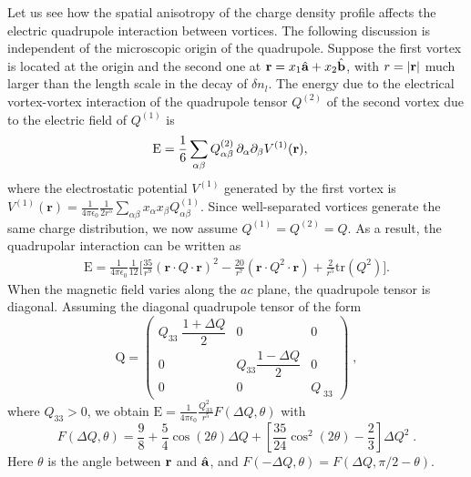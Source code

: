 Let us see how the spatial anisotropy of the charge density profile affects the electric quadrupole interaction between vortices.
The following discussion is independent of the microscopic origin of the quadrupole.
Suppose the first vortex is located at the origin and the second one at   $\mathbf r=x_1\hat{\mathbf a}+x_2\hat{\mathbf b}$, with $r=|\mathbf r|$ much larger than the length scale in the decay of $\delta n_l$.  The energy due to the electrical vortex-vortex interaction of the quadrupole tensor $Q^{(2)}$  of the second vortex due to the electric field of $Q^{(1)}$  is
\begin{equation}
\begin{split}
 \mathrm E &= \frac{1}{6}  \sum_{\alpha\beta} Q^{(2)}_{\alpha \beta}  \,  \partial_\alpha \partial_\beta V^{(1)}(\mathbf r)  ,
\end{split}
\end{equation}
where the electrostatic potential $V^{(1)}$ generated by  the first vortex is $V^{(1)}(\mathbf{r}) = \frac{1}{4 \pi \epsilon_0}  \frac{1}{2r^5}  \sum_{\alpha\beta} x_\alpha x_\beta Q_{\alpha \beta}^{(1)}$.
Since well-separated vortices generate the same charge distribution, we now assume $Q^{(1)}=Q^{(2)}=Q$.
As a result, the quadrupolar interaction can be written as
\begin{align}
    \mathrm E = \frac{1}{4 \pi \epsilon_0}\frac{1}{12}\Big[
    \frac{35}{r^9}\left(\mathbf{r}\cdot{Q}\!\cdot\mathbf{r}\right)^2\!\!
    -\!\frac{20}{r^7}\left(\mathbf{r}\cdot{Q}^2\!\cdot\mathbf{r}\right)\!
    +\!\frac{2}{r^5}\mathrm{ tr}\left( {Q}^2\right)\!\Big].
\end{align}
When the magnetic field varies along the $ac$ plane, the quadrupole tensor is diagonal.
Assuming the diagonal quadrupole tensor of the form
\begin{equation}
    \mathrm{Q} =
     \left(\begin{array}{ccc}
         Q_{33} \; \dfrac{1+\Delta Q}{2} & 0 & 0  \\
         0 & Q_{33} \dfrac{1-\Delta Q}{2} & 0  \\
         0 & 0  & Q_{\; 33}
    \end{array}\right) \; ,
\end{equation} where $Q_{33}>0$,
we obtain
$\mathrm E = \frac{1}{4 \pi \epsilon_0} \frac{Q^2_{33}}{ r^5} F(\Delta Q, \theta)$ with
\begin{equation}
F(\Delta Q,\theta)=
    \frac{9}{8}
    +\frac{5}{4} \cos (2\theta)    \Delta  Q
    +\left[ \frac{35}{24} \cos^2 (2\theta)-\frac{2}{3} \right]\Delta Q^2
 \label{eq:E-cos} \; .
\end{equation}
Here $\theta$ is the angle between $\mathbf r$ and $\hat{\mathbf a}$, and   $F(-\Delta Q,\theta)=F(\Delta Q,\pi/2-\theta)$.

